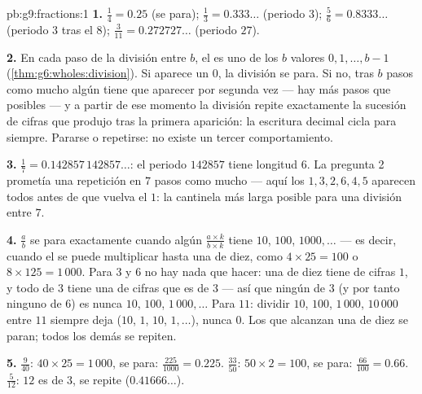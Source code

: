 \begin{solution}{pb:g9:fractions:1}
\textbf{1.} $\frac14 = 0.25$ (se para); $\frac13 = 0.333\ldots$
(periodo $3$); $\frac56 = 0.8333\ldots$ (periodo $3$ tras el
$8$); $\frac{3}{11} = 0.272727\ldots$ (periodo $27$).

\textbf{2.} En cada paso de la división entre $b$, el 
es uno de los $b$ valores $0, 1, \dots, b - 1$
(\cref{thm:g6:wholes:division}). Si aparece un  $0$, la
división se para. Si no, tras $b$ pasos como mucho algún
 tiene que aparecer por segunda vez --- hay más pasos
que  posibles --- y a partir de ese momento la división
repite exactamente la sucesión de cifras que produjo tras la
primera aparición: la escritura decimal cicla para siempre. Pararse o
repetirse: no existe un tercer comportamiento.

\textbf{3.} $\frac17 = 0.142857\,142857\ldots$: el periodo
$142857$ tiene longitud $6$. La pregunta 2 prometía una repetición en
$7$ pasos como mucho --- aquí los 
$1, 3, 2, 6, 4, 5$ aparecen todos antes de que vuelva el $1$: la
cantinela más larga posible para una división entre $7$.

\textbf{4.} $\frac ab$ se para exactamente cuando algún
$\frac{a \times k}{b \times k}$ tiene  $10$, $100$,
$1000, \dots$ --- es decir, cuando el  se puede
multiplicar hasta una  de diez, como $4 \times 25 = 100$ o
$8 \times 125 = 1\,000$. Para $3$ y $6$ no hay nada que hacer: una
 de diez tiene  de cifras $1$, y todo  de $3$ tiene
una  de cifras que es  de $3$ --- así que ningún  de $3$
(y por tanto ninguno de $6$) es nunca $10$, $100$, $1\,000, \dots$ Para
$11$: dividir $10$, $100$, $1\,000$, $10\,000$ entre $11$ siempre
deja  ($10$, $1$, $10$, $1, \dots$), nunca $0$.
Los  que alcanzan una  de diez se paran; todos los demás se repiten.

\textbf{5.} $\frac{9}{40}$: $40 \times 25 = 1\,000$, se para:
$\frac{225}{1000} = 0.225$. $\frac{33}{50}$:
$50 \times 2 = 100$, se para: $\frac{66}{100} = 0.66$.
$\frac{5}{12}$: $12$ es  de $3$, se repite
($0.41666\ldots$).


\end{solution}

